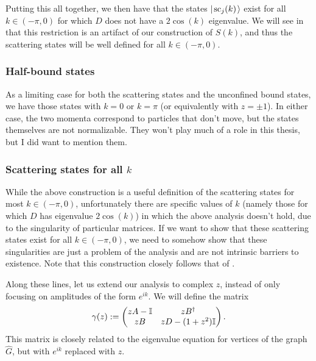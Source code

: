 \documentclass[../thesis-main/thesis-main]{subfiles}
\begin{document}
Putting this all together, we then have that the states $|\mspace{2mu} \text{sc}_j(k) \mspace{2mu} \rangle$ exist for all $k\in (-\pi,0)$ for which $D$ does not have a $2\cos(k)$ eigenvalue.  We will see in  that this restriction is an artifact of our construction of $S(k)$, and thus the scattering states will be well defined for all $k\in (-\pi,0)$.


\subsubsection{Half-bound states}

As a limiting case for both the scattering states and the unconfined bound states, we have those states with $k = 0$ or $k= \pi$ (or equivalently with $z = \pm 1$).  In either case, the two momenta correspond to particles that don't move, but the states themselves are not normalizable.  They won't play much of a role in this thesis, but I did want to mention them.


\subsubsection{Scattering states for all $k$}\label{sec:def_of_gamma_matrix}

While the above construction is a useful definition of the scattering states for most ${k\in(-\pi,0)}$, unfortunately there are specific values of $k$ (namely those for which $D$ has eigenvalue $2\cos(k)$) in which the above analysis doesn't hold, due to the singularity of particular matrices.  If we want to show that these scattering states exist for all $k\in (-\pi,0)$, we need to somehow show that these singularities are just a problem of the analysis and are not intrinsic barriers to existence.  Note that this construction closely follows that of \cite{CG12}.

Along these lines, let us extend our analysis to complex $z$, instead of only focusing on amplitudes of the form $e^{ik}$.  We will define the matrix
\begin{equation}
  \gamma(z) := \begin{pmatrix}  z A - \mathbb{I} & z B^\dag\\
    z B & zD - (1+z^2) \mathbb{I}\end{pmatrix}.
    \label{eq:gamma_def}
\end{equation}
This matrix is closely related to the eigenvalue equation for vertices of the graph $\widehat{G}$, but with $e^{ik}$ replaced with $z$.  
\end{document}
